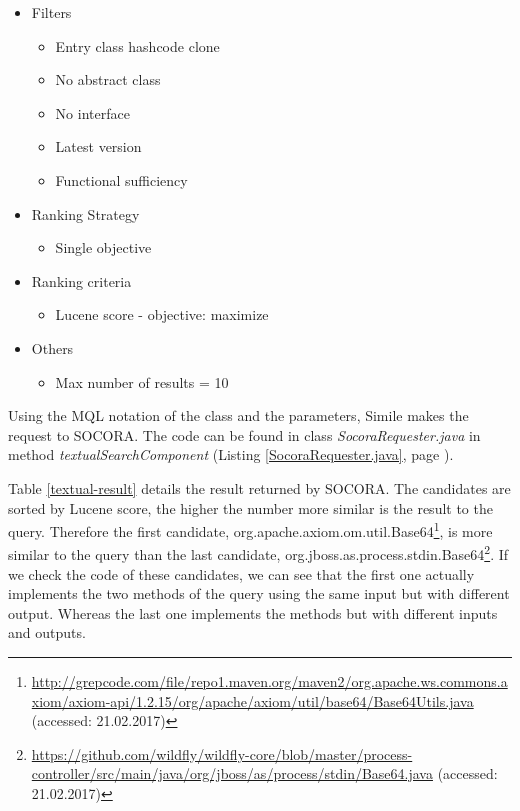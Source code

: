 \begin{itemize}
\item Filters
	\begin{itemize}
	\item Entry class hashcode clone
	\item No abstract class
	\item No interface
	\item Latest version
	\item Functional sufficiency
	\end{itemize}
\item Ranking Strategy
	\begin{itemize}
	\item Single objective
	\end{itemize}
\item Ranking criteria
	\begin{itemize}
	\item Lucene score - objective: maximize
	\end{itemize}
\item Others
	\begin{itemize}
	\item Max number of results = 10
	\end{itemize}
\end{itemize}

Using the MQL notation of the class and the parameters, Simile makes the request to SOCORA. The code can be found in class \emph{SocoraRequester.java} in method \emph{textualSearchComponent} (Listing \ref{SocoraRequester.java}, page \pageref{SocoraRequester.java}). 

Table \ref{textual-result} details the result returned by SOCORA. The candidates are sorted by Lucene score, the higher the number more similar is the result to the query. Therefore the first candidate, org.apache.axiom.om.util.Base64\footnote{\url{http://grepcode.com/file/repo1.maven.org/maven2/org.apache.ws.commons.axiom/axiom-api/1.2.15/org/apache/axiom/util/base64/Base64Utils.java} (accessed: 21.02.2017)}, is more similar to the query than the last candidate, org.jboss.as.process.stdin.Base64\footnote{\url{https://github.com/wildfly/wildfly-core/blob/master/process-controller/src/main/java/org/jboss/as/process/stdin/Base64.java} (accessed: 21.02.2017)}. If we check the code of these candidates, we can see that the first one actually implements the two methods of the query using the same input but with different output. Whereas the last one implements the methods but with different inputs and outputs.


